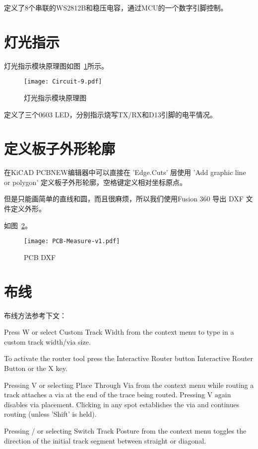 定义了8个串联的WS2812B和稳压电容，通过MCU的一个数字引脚控制。

\section{灯光指示}

灯光指示模块原理图如图~\ref{fig:Circuit-9}所示。

\begin{figure}[htbp]
    \centering
    \texttt{[image: Circuit-9.pdf]}
    \caption{灯光指示模块原理图}
    \label{fig:Circuit-9}
\end{figure}

定义了三个0603 LED，分别指示烧写TX/RX和D13引脚的电平情况。

\section{定义板子外形轮廓}

在KiCAD PCBNEW编辑器中可以直接在 'Edge.Cuts' 层使用 'Add graphic line or polygon' 定义板子外形轮廓，空格键定义相对坐标原点。

但是只能画简单的直线和圆，而且很麻烦，所以我们使用Fusion 360 导出 DXF 文件定义外形。

如图~\ref{fig:PCB-Measure-v1}。

\begin{figure}[htbp]
    \centering
    \texttt{[image: PCB-Measure-v1.pdf]}
    \caption{PCB DXF}
    \label{fig:PCB-Measure-v1}
\end{figure}


\section{布线}

布线方法参考下文：

Press W or select Custom Track Width from the context menu to type in a custom track width/via size.

To activate the router tool press the Interactive Router button Interactive Router Button or the X key. 

Pressing V or selecting Place Through Via from the context menu while routing a track attaches a via at the end of the trace being routed. Pressing V again disables via placement. Clicking in any spot establishes the via and continues routing (unless 'Shift' is held).

Pressing / or selecting Switch Track Posture from the context menu toggles the direction of the initial track segment between straight or diagonal.


